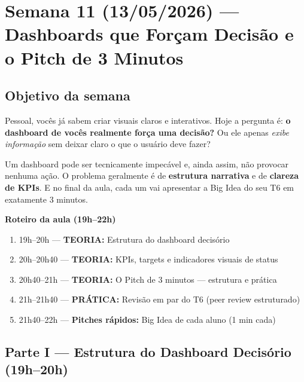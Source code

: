 
\chapter{Semana 11 (13/05/2026) — Dashboards que Forçam Decisão e o Pitch de 3 Minutos}

\section{Objetivo da semana}

Pessoal, vocês já sabem criar visuais claros e interativos. Hoje a pergunta é:
\textbf{o dashboard de vocês realmente força uma decisão?} Ou ele apenas
\emph{exibe informação} sem deixar claro o que o usuário deve fazer?

Um dashboard pode ser tecnicamente impecável e, ainda assim, não provocar
nenhuma ação. O problema geralmente é de \textbf{estrutura narrativa} e
de \textbf{clareza de KPIs}. E no final da aula, cada um vai apresentar
a Big Idea do seu T6 em exatamente 3 minutos.

\begin{BoardBox}
\textbf{Roteiro da aula (19h–22h)}
\begin{enumerate}
  \item 19h–20h — \textbf{TEORIA:} Estrutura do dashboard decisório
  \item 20h–20h40 — \textbf{TEORIA:} KPIs, targets e indicadores visuais de status
  \item 20h40–21h — \textbf{TEORIA:} O Pitch de 3 minutos — estrutura e prática
  \item 21h–21h40 — \textbf{PRÁTICA:} Revisão em par do T6 (peer review estruturado)
  \item 21h40–22h — \textbf{Pitches rápidos:} Big Idea de cada aluno (1 min cada)
\end{enumerate}
\end{BoardBox}

\section{Parte I — Estrutura do Dashboard Decisório (19h–20h)}

